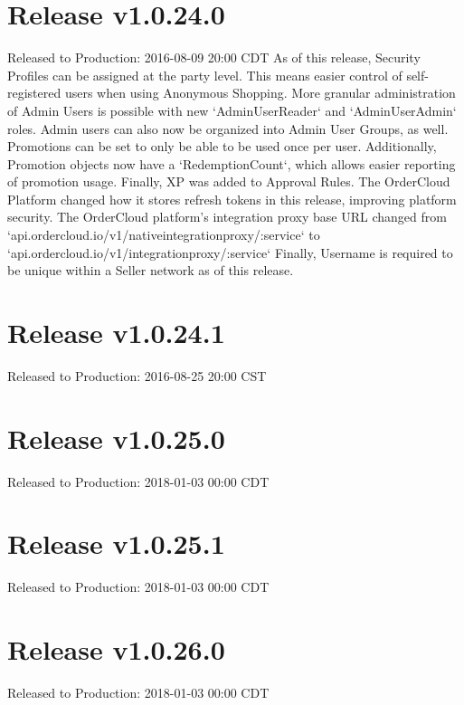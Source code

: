 \documentclass{article}%
\begin{document}
%
\section{Release v1.0.24.0}%
\label{sec:Release v1.0.24.0}%
Released to Production: 2016{-}08{-}09 20:00 CDT%
\newline%
As of this release, Security Profiles can be assigned at the party level. This means easier control of self{-}registered users when using Anonymous Shopping. More granular administration of Admin Users is possible with new `AdminUserReader` and `AdminUserAdmin` roles. Admin users can also now be organized into Admin User Groups, as well. Promotions can be set to only be able to be used once per user. Additionally, Promotion objects now have a `RedemptionCount`, which allows easier reporting of promotion usage. Finally, XP was added to Approval Rules. \newline%
 The OrderCloud Platform changed how it stores refresh tokens in this release, improving platform security.\newline%
 The OrderCloud platform's integration proxy base URL changed from `api.ordercloud.io/v1/nativeintegrationproxy/:service` to `api.ordercloud.io/v1/integrationproxy/:service`\newline%
 Finally, Username is required to be unique within a Seller network as of this release. 

%
\section{Release v1.0.24.1}%
\label{sec:Release v1.0.24.1}%
Released to Production: 2016{-}08{-}25 20:00 CST%
\newline%

%
\section{Release v1.0.25.0}%
\label{sec:Release v1.0.25.0}%
Released to Production: 2018{-}01{-}03 00:00 CDT%
\newline%

%
\section{Release v1.0.25.1}%
\label{sec:Release v1.0.25.1}%
Released to Production: 2018{-}01{-}03 00:00 CDT%
\newline%

%
\section{Release v1.0.26.0}%
\label{sec:Release v1.0.26.0}%
Released to Production: 2018{-}01{-}03 00:00 CDT%
\newline%
\end{document}
